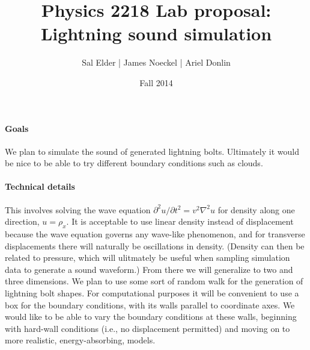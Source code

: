 \documentclass{article}
\title{Physics 2218 Lab proposal:\\ Lightning sound simulation}
\author{Sal Elder | James Noeckel | Ariel Donlin}
\date{Fall 2014}
\begin{document}
\maketitle
\paragraph {Goals} We plan to simulate the sound of generated lightning bolts. Ultimately it would be nice to be able to try different boundary conditions such as clouds.
\paragraph {Technical details} This involves solving the wave equation $\partial ^2u/\partial t^2=v^2\nabla ^2u$ for density along one direction, $u=\rho_x.$ It is acceptable to use linear density instead of displacement because the wave equation governs any wave-like phenomenon, and for transverse displacements there will naturally be oscillations in density. (Density can then be related to pressure, which will ulitmately be useful when sampling simulation data to generate a sound waveform.) From there we will generalize to two and three dimensions. We plan to use some sort of random walk for the generation of lightning bolt shapes. For computational purposes it will be convenient to use a box for the boundary conditions, with its walls parallel to coordinate axes. We would like to be able to vary the boundary conditions at these walls, beginning with hard-wall conditions (i.e., no displacement permitted) and moving on to more realistic, energy-absorbing, models.
\end{document}
